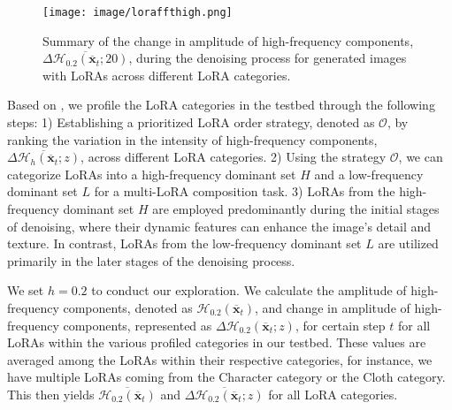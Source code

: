 \vspace{-23pt}
\begin{wrapfigure}{r}{0.5\textwidth}
\setlength{\abovecaptionskip}{-6pt}
  \setlength{\belowcaptionskip}{-15pt}
  \begin{center}
    \texttt{[image: image/loraffthigh.png]}
  \end{center}
  \caption{Summary of the change in amplitude of high-frequency components, $\overline{\Delta\mathcal{H}_{0.2}\left(\overline{\mathbf{x}}_{t};20\right)}$, during the denoising process for generated images with LoRAs across different LoRA categories.}
  \label{fig:loraffthigh}
\end{wrapfigure}


Based on , we profile the LoRA categories in the testbed through the following steps: 1) Establishing a prioritized LoRA order strategy, denoted as $\mathcal{O}$, by ranking the variation in the intensity of high-frequency components, $\overline{\Delta\mathcal{H}_{h}\left(\overline{\mathbf{x}}_{t};z\right)}$, across different LoRA categories. 2) Using the strategy $\mathcal{O}$, we can categorize LoRAs into a high-frequency dominant set $H$ and a low-frequency dominant set $L$ for a multi-LoRA composition task. 3) LoRAs from the high-frequency dominant set $H$ are employed predominantly during the initial stages of denoising, where their dynamic features can enhance the image’s detail and texture. In contrast, LoRAs from the low-frequency dominant set $L$ are utilized primarily in the later stages of the denoising process.

We set $h=0.2$ to conduct our exploration. We calculate the amplitude of high-frequency components, denoted as $\mathcal{H}_{0.2}(\overline{\mathbf{x}}_{t})$, and change in amplitude of high-frequency components, represented as $\Delta\mathcal{H}_{0.2}\left(\overline{\mathbf{x}}_{t};z\right)$, for certain step $t$ for all LoRAs within the various profiled categories in our testbed. These values are averaged among the LoRAs within their respective categories, for instance, we have multiple LoRAs coming from the Character category or the Cloth category. This then yields $\overline{\mathcal{H}_{0.2}(\overline{\mathbf{x}}_{t})}$ and $\overline{\Delta\mathcal{H}_{0.2}\left(\overline{\mathbf{x}}_{t};z\right)}$ for all LoRA categories.

